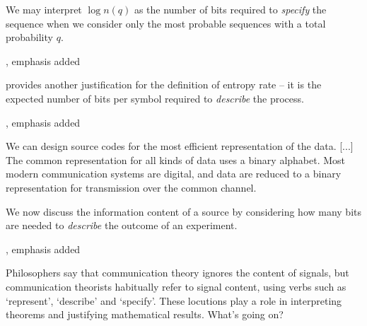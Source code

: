 \documentclass[12pt]{article}
\begin{document}
\begin{myquote}
We may interpret $\log{n(q)}$ as the number of bits required to \textit{specify} the sequence when we consider only the most probable sequences with a total probability $q$.
\par\hspace*{\fill}\citet[397]{shannon1948mathematicalc}, emphasis added
\end{myquote}

\begin{myquote}
 provides another justification for the definition of entropy rate -- it is the expected number of bits per symbol required to \textit{describe} the process.
\par\hspace*{\fill}\citet[115]{cover2006elements}, emphasis added
\end{myquote}

\begin{myquote}
We can design source codes for the most efficient representation of the data. [...] The common representation for all kinds of data uses a binary alphabet. Most modern communication systems are digital, and data are reduced to a binary representation for transmission over the common channel.
\par\hspace*{\fill}\citet[218]{cover2006elements}
\end{myquote}

\begin{myquote}
We now discuss the information content of a source by considering how many bits are needed to \textit{describe} the outcome of an experiment.
\par\hspace*{\fill}\citet[73]{mackay2003information}, emphasis added
\end{myquote}

\noindent Philosophers say that communication theory ignores the content of signals, but communication theorists habitually refer to signal content, using verbs such as `represent', `describe' and `specify'.
These locutions play a role in interpreting theorems and justifying mathematical results.
What's going on?
\end{document}
